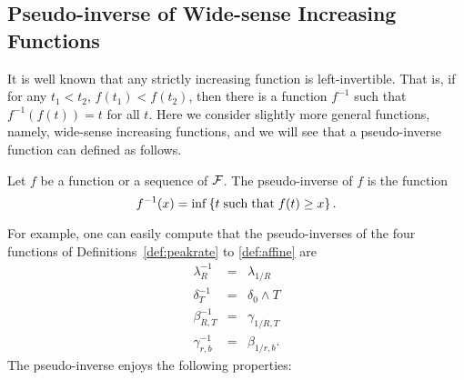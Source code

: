 \subsection{Pseudo-inverse of Wide-sense Increasing Functions}
It is well known that any strictly increasing function is
left-invertible. That is, if for any $t_1 < t_2$, $f(t_1) <
f(t_2)$, then there is a function $f^{-1}$ such that $f^{-1}(f(t))
= t$ for all $t$. Here we consider slightly more general
functions, namely, wide-sense increasing functions, and we will
see that a pseudo-inverse function can defined as follows.
\begin{definition}
Let $f$ be a function or a sequence of $\mathcal F$. The pseudo-inverse of $f$ is the function
\begin{equation}
\mylabel{eq:pseudo-inverse}
f^{-1}(x) = \inf \left\{ t  \mst f(t) \geq x \right\}.
\end{equation}
\end{definition}
For example, one can easily compute that the pseudo-inverses of the four functions of Definitions~\ref{def:peakrate} to
\ref{def:affine} are
\begin{eqnarray*}
\lambda_R^{-1} & = & \lambda_{1/R} \\
\delta_{T}^{-1} & = & \delta_0 \wedge T \\
\beta_{R,T}^{-1} & = & \gamma_{1/R,T}\\
\gamma_{r,b}^{-1} & = & \beta_{1/r,b}.
\end{eqnarray*}
The pseudo-inverse enjoys the following properties:
